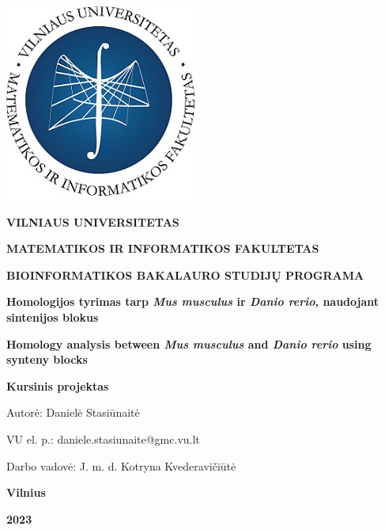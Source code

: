 \documentclass[12pt]{article}
\begin{document}

\begin{titlepage}
\vskip 20pt
\begin{center}
\includegraphics[scale=0.5]{MIF}
\end{center}


\vskip 20pt
\centerline{\bf \large \textbf{VILNIAUS UNIVERSITETAS}}
\bigskip
\centerline{\large \textbf{MATEMATIKOS IR INFORMATIKOS FAKULTETAS}}
\bigskip
\centerline{\large \textbf{BIOINFORMATIKOS BAKALAURO STUDIJŲ PROGRAMA}}

\vskip 90pt
\begin{center}
    {\bf \LARGE Homologijos tyrimas tarp \emph{Mus musculus} ir
     \emph{Danio rerio}, naudojant sintenijos blokus}
\end{center}
\begin{center}
    {\bf \Large Homology analysis between \emph{Mus musculus} and
     \emph{Danio rerio} using synteny blocks}
\end{center}
\vskip 20pt
\centerline{\bf \large \textbf{Kursinis projektas}}
\bigskip
\vskip 40pt

\hskip 140pt {\large Autorė: Danielė Stasiūnaitė}

\hskip 140pt{\large VU el. p.: daniele.stasiunaite@gmc.vu.lt}
\bigskip
\vskip 20pt

\hskip 140pt {\large Darbo vadovė: J. m. d. Kotryna Kvederavičiūtė}
\vskip 60pt
\vskip 40pt
\centerline{\large \textbf{Vilnius}}
\centerline{\large \textbf{2023}}
\newpage
\end{titlepage}



\tableofcontents
\newpage
\end{document}

